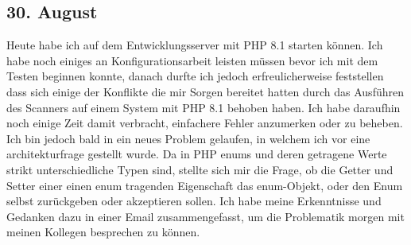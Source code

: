 \subsection{30. August}
Heute habe ich auf dem Entwicklungsserver mit PHP 8.1 starten können. Ich habe noch einiges an Konfigurationsarbeit leisten müssen bevor ich mit dem Testen beginnen konnte, danach durfte ich jedoch erfreulicherweise feststellen dass sich einige der Konflikte die mir Sorgen bereitet hatten durch das Ausführen des Scanners auf einem System mit PHP 8.1 behoben haben. Ich habe daraufhin noch einige Zeit damit verbracht, einfachere Fehler anzumerken oder zu beheben. Ich bin jedoch bald in ein neues Problem gelaufen, in welchem ich vor eine architekturfrage gestellt wurde. Da in PHP enums und deren getragene Werte strikt unterschiedliche Typen sind, stellte sich mir die Frage, ob die Getter und Setter einer einen enum tragenden Eigenschaft das enum-Objekt, oder den Enum selbst zurückgeben oder akzeptieren sollen. Ich habe meine Erkenntnisse und Gedanken dazu in einer Email zusammengefasst, um die Problematik morgen mit meinen Kollegen besprechen zu können.